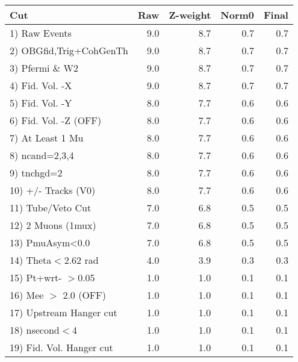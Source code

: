  \begin{table}[h!]\centering
 \begin{tabular}{||l||r|r|r|r||}
 \hline
 \hline
 Cut & Raw & Z-weight & Norm0 & Final \\
 \hline
  1) Raw Events           &         9.0 &         8.7 &         0.7 &         0.7 \\
  2) OBGfid,Trig+CohGenTh &         9.0 &         8.7 &         0.7 &         0.7 \\
  3) Pfermi \& W2         &         9.0 &         8.7 &         0.7 &         0.7 \\
  4) Fid. Vol. -X         &         9.0 &         8.7 &         0.7 &         0.7 \\
  5) Fid. Vol. -Y         &         8.0 &         7.7 &         0.6 &         0.6 \\
  6) Fid. Vol. -Z (OFF)   &         8.0 &         7.7 &         0.6 &         0.6 \\
  7) At Least 1 Mu        &         8.0 &         7.7 &         0.6 &         0.6 \\
  8) ncand=2,3,4          &         8.0 &         7.7 &         0.6 &         0.6 \\
  9) tnchgd=2             &         8.0 &         7.7 &         0.6 &         0.6 \\
 10) +/- Tracks (V0)      &         8.0 &         7.7 &         0.6 &         0.6 \\
 11) Tube/Veto Cut        &         7.0 &         6.8 &         0.5 &         0.5 \\
 12) 2 Muons (1mux)       &         7.0 &         6.8 &         0.5 &         0.5 \\
 13) PmuAsym<0.0          &         7.0 &         6.8 &         0.5 &         0.5 \\
 14) Theta$<$2.62 rad     &         4.0 &         3.9 &         0.3 &         0.3 \\
 15) Pt+wrt- $>$0.05      &         1.0 &         1.0 &         0.1 &         0.1 \\
 16) Mee $>$ 2.0  (OFF)   &         1.0 &         1.0 &         0.1 &         0.1 \\
 17) Upstream Hanger cut  &         1.0 &         1.0 &         0.1 &         0.1 \\
 18) nsecond$<$4          &         1.0 &         1.0 &         0.1 &         0.1 \\
 19) Fid. Vol. Hanger cut &         1.0 &         1.0 &         0.1 &         0.1 \\

\end{tabular}
\end{table}
